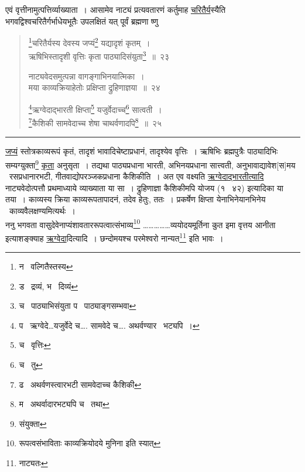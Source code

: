 \documentclass[11pt, openany]{book}
\begin{document}
\begin{sloppypar}
एवं वृत्तीनामुत्पत्तिर्व्याख्याता~। आसामेव नाट्यं प्रत्यवतारणं कर्तुमाह \underline{चरितैर्य}स्यैति भगवद्विश्वचरितैर्गर्भाधेयभूतैः उपलक्षितं यत् पूर्वं ब्रह्मणा ष्णु
\end{sloppypar}


\newpage
\lfoot{}

\begin{quote}
{\na \renewcommand{\thefootnote}{1}\footnote{न \textendash\ वल्गितैस्तस्य}चरितैर्यस्य देवस्य जप्यं\renewcommand{\thefootnote}{2}\footnote{ड \textendash\ द्रव्यं, भ \textendash\ दिव्यं} यद्यादृशं कृतम्~।\\
ऋषिभिस्तादृशी वृत्तिः कृता पाठ्यादिसंयुता\renewcommand{\thefootnote}{3}\footnote{च \textendash\ पाठ्याभिसंयुता प \textendash\ पाठ्याङ्गसम्भवा}~॥~२३

नाट्यवेदसमुत्पन्ना वागङ्गाभिनयात्मिका~।\\
मया काव्यक्रियाहेतोः प्रक्षिप्ता द्रुहिणाज्ञया~॥~२४

\renewcommand{\thefootnote}{4}\footnote{प \textendash\ ऋग्वेदे\ldots यजुर्वेदे च\ldots. सामवेदे च\ldots. अथर्वण्यार \textendash\ भट्यपि~।}ऋग्वेदाद्भारती क्षिप्ता\renewcommand{\thefootnote}{5}\footnote{च \textendash\ वृत्तिः} यजुर्वेदाच्च\renewcommand{\thefootnote}{6}\footnote{च \textendash\ तु} सात्वती~।\\
\renewcommand{\thefootnote}{7}\footnote{ढ \textendash\ अथर्वणस्त्वारभटी सामवेदाच्च कैशिकी}कैशिकी सामवेदाच्च शेषा चाथर्वणादपि\renewcommand{\thefootnote}{8}\footnote{म \textendash\ अथर्वादारभट्यपि च \textendash\ तथा}~॥~२५}
\end{quote}

\hrule

\vspace{2mm}
\noindent
\underline{जप्यं} स्तोत्रकाव्यरूपं कृतं, तादृशं भावादिचेष्टाप्रधानं, तादृश्येव वृत्तिः~। ऋषिभिः ब्रह्मपुत्रैः पाठ्यादिभिः सम्यग्युक्ता\renewcommand{\thefootnote}{1}\footnote{संयुक्ता} \underline{कृता} अनुसृता~। तद्यथा पाठ्यप्रधाना भारती, अभिनयप्रधाना सात्त्वती, अनुभावाद्यावेश[स]मय \textendash\ रसप्रधानारभटी, गीतवाद्योपरञ्जकप्रधाना कैशिकीति~। अत एव वक्ष्यति \underline{ऋग्वेदाद्भारतीत्यादि} नाट्यवेदोत्पत्तौ प्रथमाध्याये व्याख्याता या सा~। द्रुहिणाज्ञा कैशिकीमपि योजय (१ \textendash\ ४२) इत्यादिका या तया~। काव्यस्य क्रिया काव्यरूपतापादनं, तदेव हेतुः, ततः~। प्रकर्षेण क्षिप्ता येनाभिनेयानभिनेय \textendash\ काव्यवैलक्षण्यमित्यर्थः~।\\

ननु भगवता वासुदेवेनाप्यंशावताररूपत्वात्संभाव्य\renewcommand{\thefootnote}{*}\footnote{{\qt रूपत्वसंभाविताः काव्यक्रियोदये मुनिना} इति स्यात्} \ldots\ldots\ldots\ldots\ldots व्ययोदयमूर्तिना कुत इमा वृत्तय आनीता इत्याशङ्क्याह \underline{ऋग्वेदा}दित्यादि~। छन्दोमयश्च परमेश्वरो नान्यत\renewcommand{\thefootnote}{2}\footnote{नाट्यतः} इति भावः~।
\end{document}
